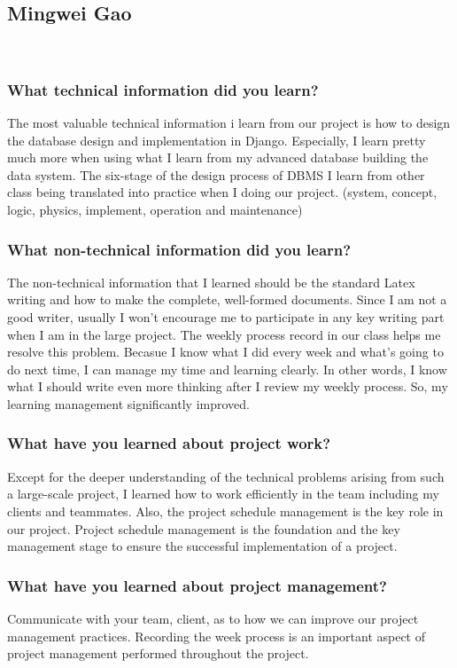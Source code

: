 \subsection{Mingwei Gao}\\
\subsubsection{What technical information did you learn?}
\noindent The most valuable technical information i learn from our project is how to design the database design and implementation in Django. Especially, I learn pretty much more when using what I learn from my advanced database building the data system. The six-stage of the design process of DBMS I learn from other class being translated into practice when I doing our project. (system, concept, logic, physics, implement, operation and maintenance)\\

\subsubsection{What non-technical information did you learn?}
\noindent The non-technical information that I learned should be the standard Latex writing and how to make the complete, well-formed documents. Since I am not a good writer, usually I won't encourage me to participate in any key writing part when I am in the large project. The weekly process record in our class helps me resolve this problem. Becasue I know what I did every week and what's going to do next time, I can manage my time and learning clearly. In other words, I know what I should write even more thinking after I review my weekly process. So, my learning management significantly improved. \\ 

\subsubsection{What have you learned about project work?}
\noindent Except for the deeper understanding of the technical problems arising from such a large-scale project, I learned how to work efficiently in the team including my clients and teammates. Also,  the project schedule management is the key role in our project. Project schedule management is the foundation and the key management stage to ensure the successful implementation of a project. \\ 

\subsubsection{What have you learned about project management?}
\noindent Communicate with your team, client, as to how we can improve our project management practices. Recording the week process is an important aspect of project management performed throughout the project. \\

